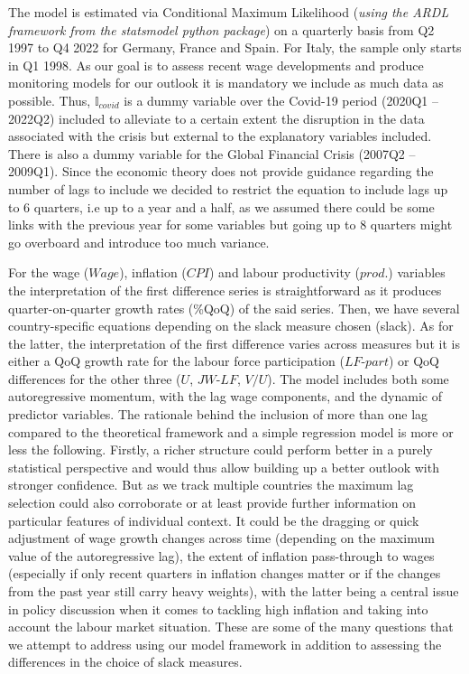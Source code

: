 The model is estimated via Conditional Maximum Likelihood (\textit{using the ARDL framework from the statsmodel python package}) on a quarterly basis from Q2 1997 to Q4 2022 for Germany, France and Spain. 
For Italy, the sample only starts in Q1 1998. As our goal is to assess recent wage developments and produce monitoring models for our outlook it is mandatory we include as much data as possible. 
Thus, $\mathbb{I}_{covid}$ is a dummy variable over the Covid-19 period (2020Q1 – 2022Q2) included to alleviate to a certain extent the disruption in the data associated with the crisis but external to the explanatory variables included. 
There is also a dummy variable for the Global Financial Crisis (2007Q2 – 2009Q1). 
Since the economic theory does not provide guidance regarding the number of lags to include we decided to restrict the equation to include lags up to 6 quarters, i.e up to a year and a half, as we assumed there could be some links with the previous year for some variables but going up to 8 quarters might go overboard and introduce too much variance.

For the wage ($Wage$), inflation ($CPI$) and labour productivity ($prod.$) variables the interpretation of the first difference series is straightforward as it produces quarter-on-quarter growth rates (\%QoQ) of the said series. 
Then, we have several country-specific equations depending on the slack measure chosen (slack). 
As for the latter, the interpretation of the first difference varies across measures but it is either a QoQ growth rate for the labour force participation ($LF\textrm{-}part$) or QoQ differences for the other three ($U$, $JW\textrm{-}LF$, $V/U$). 
The model includes both some autoregressive momentum, with the lag wage components, and the dynamic of predictor variables. 
The rationale behind the inclusion of more than one lag compared to the theoretical framework and a simple regression model is more or less the following. 
Firstly, a richer structure could perform better in a purely statistical perspective and would thus allow building up a better outlook with stronger confidence. 
But as we track multiple countries the maximum lag selection could also corroborate or at least provide further information on particular features of individual context. 
It could be the dragging or quick adjustment of wage growth changes across time (depending on the maximum value of the autoregressive lag), the extent of inflation pass-through to wages (especially if only recent quarters in inflation changes matter or if the changes from the past year still carry heavy weights), with the latter being a central issue in policy discussion when it comes to tackling high inflation and taking into account the labour market situation. 
These are some of the many questions that we attempt to address using our model framework in addition to assessing the differences in the choice of slack measures.

